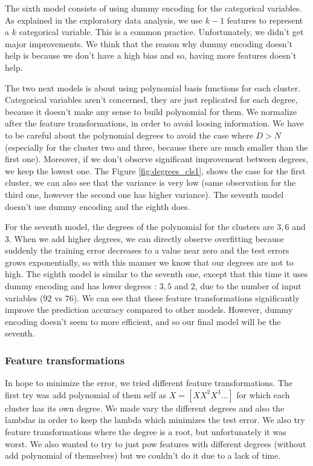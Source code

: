 \documentclass{article} %
\begin{document}
The sixth model consists of using dummy encoding for the categorical variables. As explained in the exploratory data analysis, we use $k-1$ features to represent a $k$ categorical variable. This is a common practice. Unfortunately, we didn't get major improvements. We think that the reason why dummy encoding doesn't help is because we don't have a high bias and so, having more features doesn't help.

The two next models is about using polynomial basis functions for each cluster. Categorical variables aren't concerned, they are just replicated for each degree, because it doesn't make any sense to build polynomial for them. We normalize after the feature transformations, in order to avoid loosing information. We have to be careful about the polynomial degrees to avoid the case where $D > N$ (especially for the cluster two and three, because there are much smaller than the first one). Moreover, if we don't observe significant improvement between degrees, we keep the lowest one. The Figure \ref{fig:degrees_cls1}, shows the case for the first cluster, we can also see that the variance is very low (same observation for the third one, however the second one has higher variance). The seventh model doesn't use dummy encoding and the eighth does.

For the seventh model, the degrees of the polynomial for the clusters are $3,6$ and $3$. When we add higher degrees, we can directly observe overfitting because suddenly the training error decreases to a value near zero and the test errors grows exponentially, so with this manner we know that our degrees are not to high. The eighth model is similar to the seventh one, except that this time it uses dummy encoding and has lower degrees : $3,5$ and $2$, due to the number of input variables ($92$ vs $76$). We can see that these feature transformations significantly improve the prediction accuracy compared to other models. However, dummy encoding doesn't seem to more efficient, and so our final model will be the seventh. 

\subsubsection{Feature transformations}

In hope to minimize the error, we tried different feature transformations. The first try was add polynomial of them self as $X = [X X^2 X^3 ...]$ for which each cluster has its own degree. We made vary the different degrees and also the lambdas in order to keep the lambda which minimizes the test error. We also try feature transformations where the degree is a root, but unfortunately it was worst. We also wanted to try to just pow features with different degrees (without add polynomial of themselves) but we couldn't do it due to a lack of time.
\end{document}
